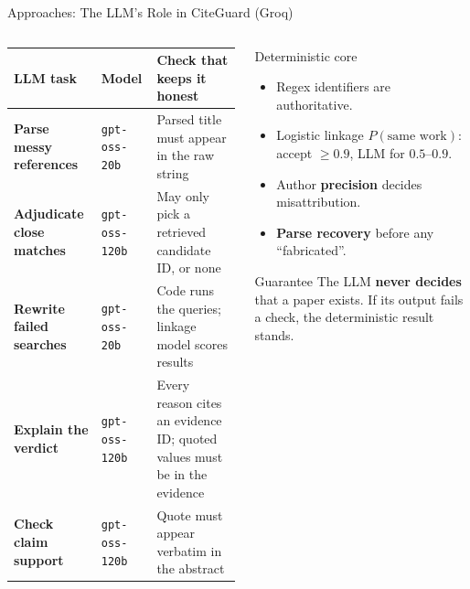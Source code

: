 \documentclass[aspectratio=169,10pt]{beamer}
\newcommand{\hl}[1]{\textcolor{accentblue}{\textbf{#1}}}
\begin{document}
\begin{frame}{Approaches: The LLM's Role in CiteGuard (Groq)}
  \begin{columns}[T]
    \begin{column}{0.60\textwidth}
      \scriptsize
      \renewcommand{\arraystretch}{1.3}
      \begin{tabular}{>{\bfseries}P{2.1cm} l P{3.2cm}}
        \toprule
        LLM task & Model & Check that keeps it honest \\
        \midrule
        Parse messy references & \texttt{gpt-oss-20b} & Parsed title must appear in the raw string \\
        Adjudicate close matches & \texttt{gpt-oss-120b} & May only pick a retrieved candidate ID, or none \\
        Rewrite failed searches & \texttt{gpt-oss-20b} & Code runs the queries; linkage model scores results \\
        Explain the verdict & \texttt{gpt-oss-120b} & Every reason cites an evidence ID; quoted values must be in the evidence \\
        Check claim support & \texttt{gpt-oss-120b} & Quote must appear verbatim in the abstract \\
        \bottomrule
      \end{tabular}
    \end{column}
    \begin{column}{0.38\textwidth}
      \begin{block}{Deterministic core}
        \small
        \begin{itemize}
          \item Regex identifiers are authoritative.
          \item Logistic linkage $P(\text{same work})$: accept $\ge 0.9$, LLM for $0.5$--$0.9$.
          \item Author \hl{precision} decides misattribution.
          \item \hl{Parse recovery} before any ``fabricated''.
        \end{itemize}
      \end{block}
      \begin{alertblock}{Guarantee}
        \small The LLM \hl{never decides} that a paper exists. If its output fails a check, the
        deterministic result stands.
      \end{alertblock}
    \end{column}
  \end{columns}
\end{frame}
\end{document}
